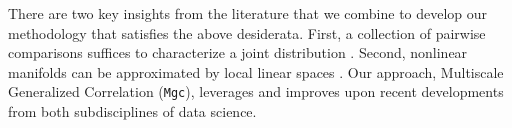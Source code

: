 \documentclass[11pt]{article}
\providecommand{\sct}[1]{{\sc \texttt{#1}}}
\newcommand{\Mgc}{\sct{Mgc}}
\begin{document}



There are two key insights from the literature that we combine to develop our methodology that satisfies the above desiderata.  First, a collection of pairwise comparisons suffices to characterize a joint distribution \cite{Maa1996}.  Second, nonlinear manifolds can be approximated by local linear spaces \cite{Allard2012}.  Our approach, Multiscale Generalized Correlation (\Mgc), leverages and improves upon recent developments from both subdisciplines of data science.
\end{document}
